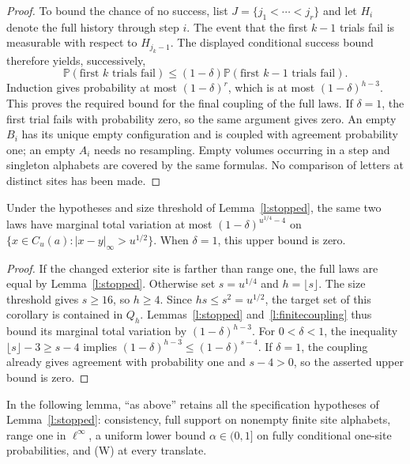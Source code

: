 \begin{proof}
To bound the chance of no success, list \(J=\{j_1<\cdots<j_r\}\)
and let \(H_i\) denote the full history through step \(i\).
The event that the first \(k-1\) trials fail is measurable with
respect to \(H_{j_k-1}\).  The displayed conditional success bound
therefore yields, successively,
\[
 \mathbb P(\text{first }k\text{ trials fail})
       \le(1-\delta)
           \mathbb P(\text{first }k-1\text{ trials fail}).
\]
Induction gives probability at most \((1-\delta)^r\), which is
at most \((1-\delta)^{h-3}\).  This proves the required bound for
the final coupling of the full laws.  If \(\delta=1\), the first
trial fails with probability zero, so the same argument gives zero.
An empty \(B_i\) has its unique empty configuration and is coupled
with agreement probability one; an empty \(A_i\) needs no resampling.
Empty volumes occurring in a step and singleton alphabets are covered
by the same formulas.  No comparison of letters at distinct sites
has been made.
\end{proof}

\begin{corollary}\label{p:surgery}
Under the hypotheses and size threshold of Lemma~\ref{l:stopped},
the same two laws have marginal total variation at most
\((1-\delta)^{u^{1/4}-4}\) on
\(\{x\in C_u(a):|x-y|_\infty>u^{1/2}\}\).
When \(\delta=1\), this upper bound is zero.
\end{corollary}

\begin{proof}
If the changed exterior site is farther than range one, the full laws
are equal by Lemma~\ref{l:stopped}.  Otherwise set
\(s=u^{1/4}\) and \(h=\lfloor s\rfloor\).
The size threshold gives \(s\ge16\), so \(h\ge4\).
Since \(hs\le s^2=u^{1/2}\), the target set of this corollary
is contained in \(Q_h\).  Lemmas~\ref{l:stopped}
and~\ref{l:finitecoupling} thus bound its marginal total variation by
\((1-\delta)^{h-3}\).
For \(0<\delta<1\), the inequality
\(\lfloor s\rfloor-3\ge s-4\) implies
\((1-\delta)^{h-3}\le(1-\delta)^{s-4}\).
If \(\delta=1\), the coupling already gives agreement with
probability one and \(s-4>0\), so the asserted upper bound is zero.
\end{proof}

In the following lemma, ``as above'' retains all the specification
hypotheses of Lemma~\ref{l:stopped}: consistency, full support on
nonempty finite site alphabets, range one in \(\ell^\infty\), a
uniform lower bound \(\alpha\in(0,1]\) on fully conditional
one-site probabilities, and (W) at every translate.

